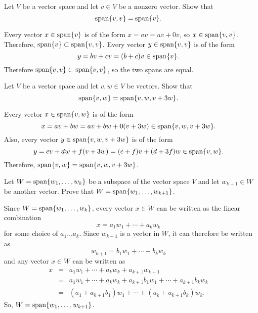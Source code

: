 \documentclass{ximera}
\begin{document}
\begin{exercise} \label{c5.2.8a}
Let $V$ be a vector space and let $v\in V$ be a nonzero vector.  Show that
\[
{\rm span}\{v,v\}={\rm span}\{v\}.
\]

\begin{solution}

Every vector $x \in {\rm span}\{v\}$ is of the form $x = av
= av + 0v$, so $x \in {\rm span}\{v,v\}$.  Therefore, ${\rm span}\{v\}
\subset {\rm span}\{v,v\}$.  Every vector $y \in {\rm span}\{v,v\}$ is of the
form 
\[
y = bv + cv = (b + c)v \in {\rm span}\{v\}.
\]
Therefore ${\rm span}\{v,v\} \subset {\rm span}\{v,v\}$, so the two spans are equal.

\end{solution}
\end{exercise}
\begin{exercise} \label{c5.2.8b}
Let $V$ be a vector space and let $v,w\in V$ be vectors.  Show that
\[
{\rm span}\{v,w\}={\rm span}\{v,w,v+3w\}.
\]

\begin{solution}
Every vector $x \in {\rm span}\{v,w\}$ is of the form 
\[
x = av + bw = av + bw + 0(v + 3w) \in {\rm span}\{v,w,v+3w\}.
\]
  Also, every vector $y \in {\rm span}\{v,w,v+3w\}$ is of the form
\[
y = cv + dw + f(v + 3w) = (c + f)v + (d + 3f)w \in {\rm span}\{v,w\}.
\]
Therefore, ${\rm span}\{v,w\} = {\rm span}\{v,w,v+3w\}$.

\end{solution}
\end{exercise}

\begin{exercise} \label{c5.2.9}
Let $W={\rm span}\{w_1,\ldots,w_k\}$ be a subspace of the vector
space $V$ and let $w_{k+1}\in W$ be another vector.  Prove that
$W={\rm span}\{w_1,\ldots,w_{k+1}\}$.

\begin{solution}

Since $W = {\rm span}\{w_1,\dots ,w_k\}$, every vector $x \in W$ can be
written as the linear combination
\[ x = a_1w_1 + \cdots + a_kw_k \]
for some choice of $a_1 \dots a_k$.  Since $w_{k + 1}$ is a vector in
$W$, it can therefore be written as
\[ w_{k + 1} = b_1w_1 + \cdots + b_kw_k \]
and any vector $x \in W$ can be written as
\[ \begin{array}{rcl}
x & = &
a_1w_1 + \cdots + a_kw_k + a_{k+1}w_{k+1} \\
& = & a_1w_1 + \cdots + a_kw_k + a_{k+1}b_1w_1 + \cdots + a_{k+1}b_kw_k
\\ & = & (a_1 + a_{k+1}b_1)w_1 + \cdots + (a_k + a_{k+1}b_k)w_k.
\end{array} \]
So, $W = {\rm span}\{w_1,\dots ,w_{k+1}\}$.

\end{solution}
\end{exercise}
\end{document}
